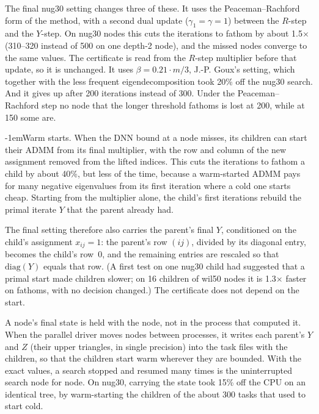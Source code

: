 \documentclass[10pt]{article}
\makeatletter
\renewcommand\paragraph{\@startsection{paragraph}{4}{\z@}{2.5ex plus 1ex minus .2ex}%
  {-1em}{\normalfont\normalsize\bfseries}}
\theoremstyle{remark}
\makeatother
\begin{document}
The final nug30 setting changes three of these. It uses the Peaceman--Rachford form
of the method, with a second dual update ($\gamma_1 = \gamma = 1$) between the
$R$-step and the $Y$-step. On nug30 nodes this cuts the iterations to fathom by
about 1.5$\times$ (310--320 instead of 500 on one depth-2 node), and the missed nodes
converge to the same values. The certificate is read from the $R$-step multiplier
before that update, so it is unchanged. It uses $\beta = 0.21\cdot m/3$, J.-P.
Goux's setting, which together with the less frequent eigendecomposition took 20\%
off the nug30 search. And it gives up after 200 iterations instead of 300. Under the
Peaceman--Rachford step no node that the longer threshold fathoms is lost at 200,
while at 150 some are.

\paragraph{Warm starts.} When the DNN bound at a node misses, its children can start
their ADMM from its final multiplier, with the row and column of the new assignment
removed from the lifted indices. This cuts the iterations to fathom a child by about
40\%, but less of the time, because a warm-started ADMM pays for many negative
eigenvalues from its first iteration where a cold one starts cheap. Starting from the
multiplier alone, the child's first iterations rebuild the primal iterate $Y$ that
the parent already had.

The final setting therefore also carries the parent's final $Y$, conditioned on the
child's assignment $x_{ij} = 1$: the parent's row $(ij)$, divided by its diagonal
entry, becomes the child's row~0, and the remaining entries are rescaled so that
$\mathrm{diag}(Y)$ equals that row. (A first test on one nug30 child had suggested
that a primal start made children slower; on 16 children of wil50 nodes it is
1.3$\times$ faster on fathoms, with no decision changed.) The
certificate does not depend on the start.

A node's final state is held with the node, not in the process that computed it.
When the parallel driver moves nodes between processes, it writes each parent's $Y$
and $Z$ (their upper triangles, in single precision) into the task files with the
children, so that the children start warm wherever they are bounded. With the exact
values, a search stopped and resumed many times is the uninterrupted search node for
node. On nug30, carrying the state took 15\% off the CPU on an identical tree, by
warm-starting the children of the about 300 tasks that used to start cold.
\end{document}
